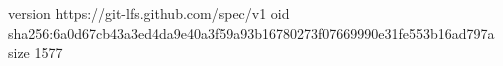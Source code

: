 version https://git-lfs.github.com/spec/v1
oid sha256:6a0d67cb43a3ed4da9e40a3f59a93b16780273f07669990e31fe553b16ad797a
size 1577

